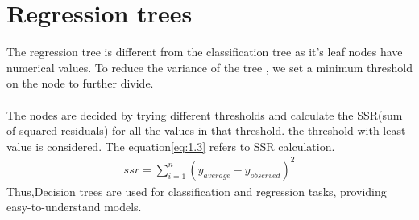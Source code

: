 \documentclass{article}
\begin{document}
 \section{Regression trees}
 The regression tree is different from the classification tree as it's leaf nodes have numerical values. To reduce the variance of the tree , we set a minimum threshold on the node to further divide. \\\\
 The nodes are decided by trying different thresholds and calculate the SSR(sum of squared residuals) for all the values in that threshold. the threshold with least value is considered. The equation\eqref{eq:1.3} refers to SSR calculation.
 \begin{align}
     ssr=\sum_{i=1}^{n}{({y_{average}-y_{observed}})^2}\label{eq:1.3}
 \end{align}
 Thus,Decision trees are used for classification and regression tasks, providing easy-to-understand models.
\end{document}
